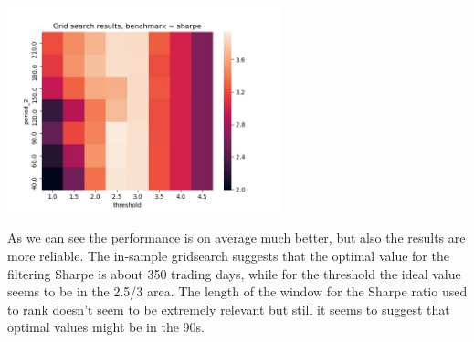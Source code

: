\begin{center}
	\centering
	\includegraphics[width=0.6\textwidth]{GridSearches/Sharpe_Ranking/Figure_3.jpeg}
	\label{Sharpe_Ranking_3}
\end{center}

As we can see the performance is on average much better, but also the results are more reliable. The in-sample gridsearch suggests that the optimal value for the filtering Sharpe is about 350 trading days, while for the threshold the ideal value seems to be in the 2.5/3 area. The length of the window for the Sharpe ratio used to rank doesn't seem to be extremely relevant but still it seems  to suggest that optimal values might be in the 90s.\\